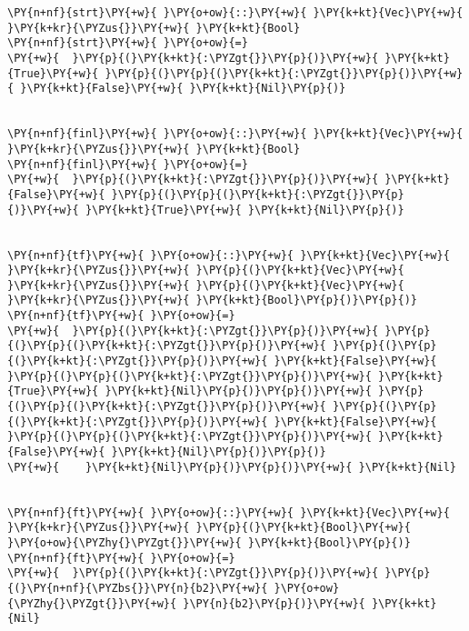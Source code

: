 {\scriptsize
\begin{Verbatim}[commandchars=\\\{\}]
\PY{n+nf}{strt}\PY{+w}{ }\PY{o+ow}{::}\PY{+w}{ }\PY{k+kt}{Vec}\PY{+w}{ }\PY{k+kr}{\PYZus{}}\PY{+w}{ }\PY{k+kt}{Bool}
\PY{n+nf}{strt}\PY{+w}{ }\PY{o+ow}{=}
\PY{+w}{  }\PY{p}{(}\PY{k+kt}{:\PYZgt{}}\PY{p}{)}\PY{+w}{ }\PY{k+kt}{True}\PY{+w}{ }\PY{p}{(}\PY{p}{(}\PY{k+kt}{:\PYZgt{}}\PY{p}{)}\PY{+w}{ }\PY{k+kt}{False}\PY{+w}{ }\PY{k+kt}{Nil}\PY{p}{)}


\PY{n+nf}{finl}\PY{+w}{ }\PY{o+ow}{::}\PY{+w}{ }\PY{k+kt}{Vec}\PY{+w}{ }\PY{k+kr}{\PYZus{}}\PY{+w}{ }\PY{k+kt}{Bool}
\PY{n+nf}{finl}\PY{+w}{ }\PY{o+ow}{=}
\PY{+w}{  }\PY{p}{(}\PY{k+kt}{:\PYZgt{}}\PY{p}{)}\PY{+w}{ }\PY{k+kt}{False}\PY{+w}{ }\PY{p}{(}\PY{p}{(}\PY{k+kt}{:\PYZgt{}}\PY{p}{)}\PY{+w}{ }\PY{k+kt}{True}\PY{+w}{ }\PY{k+kt}{Nil}\PY{p}{)}


\PY{n+nf}{tf}\PY{+w}{ }\PY{o+ow}{::}\PY{+w}{ }\PY{k+kt}{Vec}\PY{+w}{ }\PY{k+kr}{\PYZus{}}\PY{+w}{ }\PY{p}{(}\PY{k+kt}{Vec}\PY{+w}{ }\PY{k+kr}{\PYZus{}}\PY{+w}{ }\PY{p}{(}\PY{k+kt}{Vec}\PY{+w}{ }\PY{k+kr}{\PYZus{}}\PY{+w}{ }\PY{k+kt}{Bool}\PY{p}{)}\PY{p}{)}
\PY{n+nf}{tf}\PY{+w}{ }\PY{o+ow}{=}
\PY{+w}{  }\PY{p}{(}\PY{k+kt}{:\PYZgt{}}\PY{p}{)}\PY{+w}{ }\PY{p}{(}\PY{p}{(}\PY{k+kt}{:\PYZgt{}}\PY{p}{)}\PY{+w}{ }\PY{p}{(}\PY{p}{(}\PY{k+kt}{:\PYZgt{}}\PY{p}{)}\PY{+w}{ }\PY{k+kt}{False}\PY{+w}{ }\PY{p}{(}\PY{p}{(}\PY{k+kt}{:\PYZgt{}}\PY{p}{)}\PY{+w}{ }\PY{k+kt}{True}\PY{+w}{ }\PY{k+kt}{Nil}\PY{p}{)}\PY{p}{)}\PY{+w}{ }\PY{p}{(}\PY{p}{(}\PY{k+kt}{:\PYZgt{}}\PY{p}{)}\PY{+w}{ }\PY{p}{(}\PY{p}{(}\PY{k+kt}{:\PYZgt{}}\PY{p}{)}\PY{+w}{ }\PY{k+kt}{False}\PY{+w}{ }\PY{p}{(}\PY{p}{(}\PY{k+kt}{:\PYZgt{}}\PY{p}{)}\PY{+w}{ }\PY{k+kt}{False}\PY{+w}{ }\PY{k+kt}{Nil}\PY{p}{)}\PY{p}{)}
\PY{+w}{    }\PY{k+kt}{Nil}\PY{p}{)}\PY{p}{)}\PY{+w}{ }\PY{k+kt}{Nil}


\PY{n+nf}{ft}\PY{+w}{ }\PY{o+ow}{::}\PY{+w}{ }\PY{k+kt}{Vec}\PY{+w}{ }\PY{k+kr}{\PYZus{}}\PY{+w}{ }\PY{p}{(}\PY{k+kt}{Bool}\PY{+w}{ }\PY{o+ow}{\PYZhy{}\PYZgt{}}\PY{+w}{ }\PY{k+kt}{Bool}\PY{p}{)}
\PY{n+nf}{ft}\PY{+w}{ }\PY{o+ow}{=}
\PY{+w}{  }\PY{p}{(}\PY{k+kt}{:\PYZgt{}}\PY{p}{)}\PY{+w}{ }\PY{p}{(}\PY{n+nf}{\PYZbs{}}\PY{n}{b2}\PY{+w}{ }\PY{o+ow}{\PYZhy{}\PYZgt{}}\PY{+w}{ }\PY{n}{b2}\PY{p}{)}\PY{+w}{ }\PY{k+kt}{Nil}
\end{Verbatim}
}
